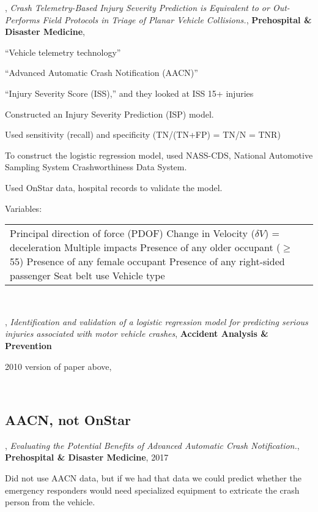 \hrulefill

\cite{13793173920190801},
{\it Crash Telemetry-Based Injury Severity Prediction is Equivalent to or Out-Performs Field Protocols in Triage of Planar Vehicle Collisions.},
{\bf Prehospital \& Disaster Medicine},

``Vehicle telemetry technology''

``Advanced Automatic Crash Notification (AACN)''

``Injury Severity Score (ISS),'' and they looked at ISS 15+ injuries

Constructed an Injury Severity Prediction (ISP) model.

Used sensitivity (recall) and specificity (TN/(TN+FP) = TN/N = TNR)

To construct the logistic regression model, used NASS-CDS, National Automotive Sampling System Crashworthiness Data System.

Used OnStar data, hospital records to validate the model.

Variables:  
\begin{tabular}{l}
	Principal direction of force (PDOF) \cr
	Change in Velocity ($\delta V$) = deceleration \cr
	Multiple impacts\cr
	Presence of any older occupant ($\ge$ 55) \cr 
	Presence of any female occupant \cr
	Presence of any right-sided passenger \cr
	Seat belt use \cr
	Vehicle type \cr
\end{tabular}

\

\cite{KONONEN2011112},
{\it Identification and validation of a logistic regression model for predicting serious injuries associated with motor vehicle crashes},
{\bf Accident Analysis \& Prevention}

2010 version of paper above, \cite{13793173920190801}

\

\subsection{AACN, not OnStar}

\cite{15857782520170401},
{\it Evaluating the Potential Benefits of Advanced Automatic Crash Notification.},
{\bf Prehospital \& Disaster Medicine}, 2017

Did not use AACN data, but if we had that data we could predict whether the emergency responders would need specialized equipment to extricate the crash person from the vehicle.

\

